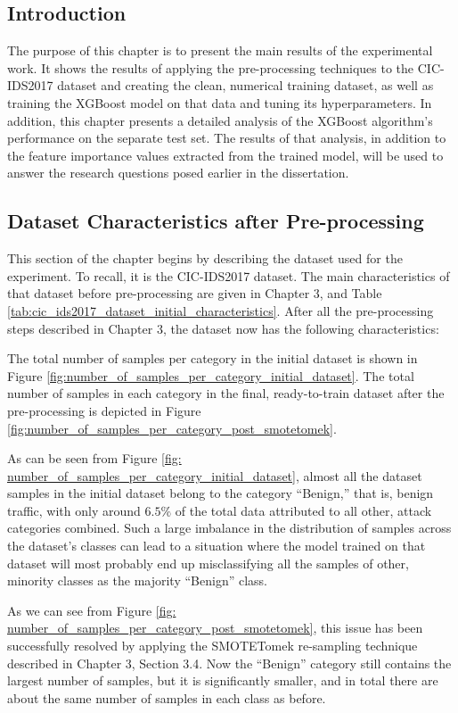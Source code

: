 \subsection{Introduction}

The purpose of this chapter is to present the main results of the experimental work. It shows the results of applying the pre-processing techniques to the CIC-IDS2017 dataset and creating the clean, numerical training dataset, as well as training the XGBoost model on that data and tuning its hyperparameters. In addition, this chapter presents a detailed analysis of the XGBoost algorithm’s performance on the separate test set. The results of that analysis, in addition to the feature importance values extracted from the trained model, will be used to answer the research questions posed earlier in the dissertation.

\subsection{Dataset Characteristics after Pre-processing}

This section of the chapter begins by describing the dataset used for the experiment. To recall, it is the CIC-IDS2017 dataset. The main characteristics of that dataset before pre-processing are given in Chapter 3, and Table \ref{tab:cic_ids2017_dataset_initial_characteristics}. After all the pre-processing steps described in Chapter 3, the dataset now has the following characteristics:

The total number of samples per category in the initial dataset is shown in Figure \ref{fig:number_of_samples_per_category_initial_dataset}. The total number of samples in each category in the final, ready-to-train dataset after the pre-processing is depicted in Figure \ref{fig:number_of_samples_per_category_post_smotetomek}.

As can be seen from Figure \ref{fig: number_of_samples_per_category_initial_dataset}, almost all the dataset samples in the initial dataset belong to the category “Benign,” that is, benign traffic, with only around $6.5\%$ of the total data attributed to all other, attack categories combined. Such a large imbalance in the distribution of samples across the dataset’s classes can lead to a situation where the model trained on that dataset will most probably end up misclassifying all the samples of other, minority classes as the majority “Benign” class.

As we can see from Figure \ref{fig: number_of_samples_per_category_post_smotetomek}, this issue has been successfully resolved by applying the SMOTETomek re-sampling technique described in Chapter 3, Section 3.4. Now the “Benign” category still contains the largest number of samples, but it is significantly smaller, and in total there are about the same number of samples in each class as before.

